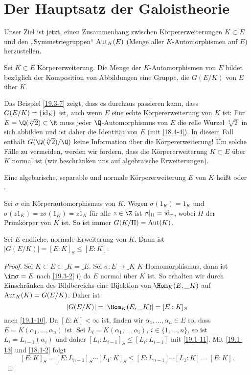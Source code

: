 \section{Der Hauptsatz der Galoistheorie}


Unser Ziel ist jetzt, einen Zusammenhang zwischen Körpererweiterungen $K \subset E$ und den „Symmetriegruppen“ $\operatorname{Aut}_K(E)$ (Menge aller $K$-Automorphismen auf $E$) herzustellen.

\begin{df} \label{19.4-1}
	Sei $K \subset E$ Körpererweiterung.
	Die Menge der $K$-Automorphismen von $E$ bildet bezüglich der Komposition von Abbildungen eine Gruppe, die  $G(E/K)$ von $E$ über $K$.
\end{df}

Das Beispiel \ref{19.3-7} zeigt, dass es durchaus passieren kann, dass $G(E/K) = \{ \operatorname{id}_E \}$ ist, auch wenn $E$ eine echte Körpererweiterung von $K$ ist:
Für $E = \Q(\sqrt[3]{2}) \subset \R$ muss jeder $\Q$-Automorphismus von $E$ die relle Wurzel $\sqrt[3]{2}$ in sich abbilden und ist daher die Identität von $E$ (mit \ref{18.4-4}).
In diesem Fall enthält $G(\Q(\sqrt[3]{2})/\Q)$ keine Information über die Körpererweiterung!
Um solche Fälle zu vermeiden, werden wir fordern, dass die Körpererweiterung $K \subset E$ über $K$ normal ist (wir beschränken uns auf algebraische Erweiterungen).

\begin{df} \label{19.4-2}
	Eine algebarische, separable und normale Körpererweiterung $E$ von $K$ heißt  oder .
\end{df}

\begin{nt} \label{19.4-3}
	Sei $\sigma$ ein Körperautomorphismus von $K$.
	Wegen $\sigma(1_K) = 1_K$ und $\sigma(z 1_K) = z \sigma(1_K) = z 1_K$ für alle $z \in \Z$ ist $\sigma|_\Pi = \operatorname{id}_\pi$, wobei $\Pi$ der Primkörper von $K$ ist.
	So ist immer $G(K / \Pi) = \operatorname{Aut}(K)$.
\end{nt}

\begin{st} \label{19.4-4}
	Sei $E$ endliche, normale Erweiterung von $K$.
	Dann ist $|G(E/K)| = [E:K]_S \le [E:K]$.
	\begin{proof}
		Sei $K \subset E \subset \_K = \_E$.
		Sei $\sigma: E \to \_K$ $K$-Homomorphismus, dann ist $\im \sigma = E$ nach \ref{19.3-2} i) da $E$ normal über $K$ ist.
		So erhalten wir durch Einschränken des Bildbereichs eine Bijektion von $\Hom_K(E, \_K)$ auf $\operatorname{Aut}_K(K) = G(E/K)$.
		Daher ist
		\[
			|G(E / K)| = | \Hom_K(E, \_K)| = [E : K]_S
		\]
		nach \ref{19.1-10}.
		Da $[E : K] < \infty$ ist, finden wir $\alpha_1, \dotsc, \alpha_n \in E$ so, dass $E = K(\alpha_1, \dotsc, \alpha_n)$ ist.
		Sei $L_i = K(\alpha_1, \dotsc, \alpha_i)$, $i \in \{1, \dotsc, n\}$, so ist $L_i = L_{i-1}(\alpha_i)$ und daher $[L_i : L_{i-1}]_S \le [L_i : L_{i-1}]$ mit \ref{19.1-11}.
		Mit \ref{19.1-13} und \ref{18.1-2} folgt
		\[
			[E:K]_S = [E : L_{n-1}]_S \dotsb [L_1 : K]_S
			\le [E : L_{n-1}] \dotsb [L_1 : K]
			= [E : K].
		\]
	\end{proof}
\end{st}

